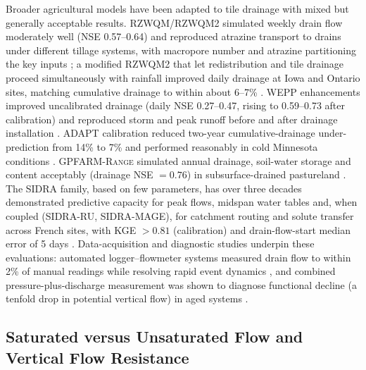 \documentclass[11pt]{article}
\begin{document}
Broader agricultural models have been adapted to tile drainage with mixed but generally acceptable results. \textsc{RZWQM}/\textsc{RZWQM2} simulated weekly drain flow moderately well (NSE 0.57--0.64) and reproduced atrazine transport to drains under different tillage systems, with macropore number and atrazine partitioning the key inputs \parencite{Malone2014,Singh1996}; a modified \textsc{RZWQM2} that let redistribution and tile drainage proceed simultaneously with rainfall improved daily drainage at Iowa and Ontario sites, matching cumulative drainage to within about 6--7\% \parencite{Xian2017}. \textsc{WEPP} enhancements improved uncalibrated drainage (daily NSE 0.27--0.47, rising to 0.59--0.73 after calibration) and reproduced storm and peak runoff before and after drainage installation \parencite{RevueltaAcosta2021,SAVABI1993}. \textsc{ADAPT} calibration reduced two-year cumulative-drainage under-prediction from 14\% to 7\% and performed reasonably in cold Minnesota conditions \parencite{Mendez2004}. \textsc{GPFARM-Range} simulated annual drainage, soil-water storage and content acceptably (drainage NSE $=0.76$) in subsurface-drained pastureland \parencite{Chen2016}. The \textsc{SIDRA} family, based on few parameters, has over three decades demonstrated predictive capacity for peak flows, midspan water tables and, when coupled (\textsc{SIDRA-RU}, \textsc{SIDRA-MAGE}), for catchment routing and solute transfer across French sites, with KGE $>0.81$ (calibration) and drain-flow-start median error of 5 days \parencite{Zimmer2023,Henine2022,LESAFFRE1988,Giraud1997}. Data-acquisition and diagnostic studies underpin these evaluations: automated logger--flowmeter systems measured drain flow to within 2\% of manual readings while resolving rapid event dynamics \parencite{Kanwar1999}, and combined pressure-plus-discharge measurement was shown to diagnose functional decline (a tenfold drop in potential vertical flow) in aged systems \parencite{Nishida2020,Gurklys2008}.

\subsection{Saturated versus Unsaturated Flow and Vertical Flow Resistance}
\end{document}
